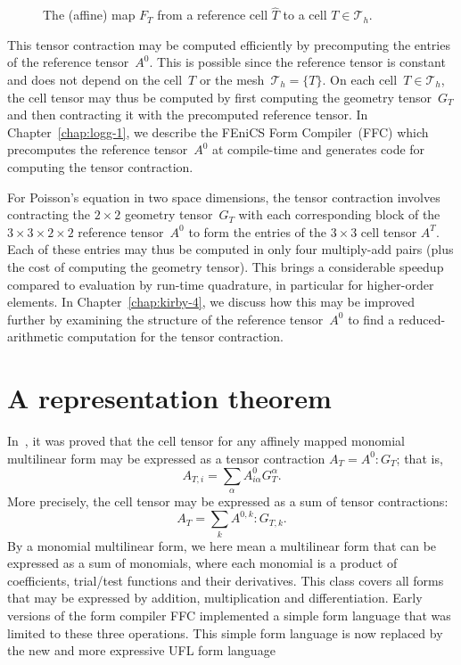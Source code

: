 \begin{figure}
  \centering
  \caption{The (affine) map $F_T$ from a reference cell $\hat{T}$
    to a cell $T \in \mathcal{T}_h$.}
  \label{fig:affinemap}
\end{figure}

This tensor contraction may be computed efficiently by precomputing
the entries of the reference tensor~$A^0$. This is possible since the
reference tensor is constant and does not depend on the cell~$T$ or
the mesh~$\mathcal{T}_h = \{T\}$. On each cell~$T \in \mathcal{T}_h$,
the cell tensor may thus be computed by first computing the geometry
tensor~$G_T$ and then contracting it with the precomputed reference
tensor. In Chapter~\ref{chap:logg-1}, we describe the FEniCS Form
Compiler~(FFC) which precomputes the reference tensor~$A^0$ at
compile-time and generates code for computing the tensor contraction.

For Poisson's equation in two space dimensions, the tensor contraction
involves contracting the $2 \times 2$ geometry tensor~$G_T$ with each
corresponding block of the $3 \times 3 \times 2 \times 2$ reference
tensor~$A^0$ to form the entries of the $3 \times 3$ cell tensor
$A^T$. Each of these entries may thus be computed in only four
multiply-add pairs (plus the cost of computing the geometry
tensor). This brings a considerable speedup compared to evaluation by
run-time quadrature, in particular for higher-order elements. In
Chapter~\ref{chap:kirby-4}, we discuss how this may be improved
further by examining the structure of the reference tensor~$A^0$ to
find a reduced-arithmetic computation for the tensor contraction.

\section{A representation theorem}

In~\citet{KirbyLogg2006}, it was proved that the cell tensor for any
affinely mapped monomial multilinear form may be expressed as a tensor
contraction $A_T = A^0 : G_T$; that is,
\begin{equation}
  A_{T,i} = \sum_{\alpha} A^0_{i\alpha} G_T^{\alpha}.
\end{equation}
More precisely, the cell tensor may be expressed as a sum of tensor
contractions:
\begin{equation} \label{eq:tensorcontraction}
  A_T = \sum_k A^{0,k} : G_{T,k}.
\end{equation}
By a monomial multilinear form, we here mean a multilinear form that
can be expressed as a sum of monomials, where each monomial is a
product of coefficients, trial/test functions and their derivatives.
This class covers all forms that may be expressed by addition,
multiplication and differentiation. Early versions of the form
compiler FFC implemented a simple form language that was limited to
these three operations. This simple form language is now replaced by
the new and more expressive UFL form language

